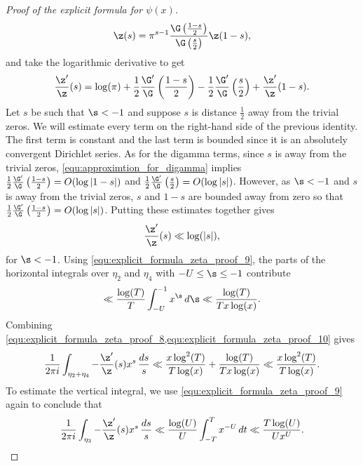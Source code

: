\begin{proof}[Proof of the explicit formula for $\psi(x)$]
      \[
        \z(s) = \pi^{s-1}\frac{\G\left(\frac{1-s}{2}\right)}{\G\left(\frac{s}{2}\right)}\z(1-s),
      \]
      and take the logarithmic derivative to get
      \[
        \frac{\z'}{\z}(s) = \log(\pi)+\frac{1}{2}\frac{\G'}{\G}\left(\frac{1-s}{2}\right)-\frac{1}{2}\frac{\G'}{\G}\left(\frac{s}{2}\right)+\frac{\z'}{\z}(1-s).
      \]
      Let $s$ be such that $\s < -1$ and suppose $s$ is distance $\frac{1}{2}$ away from the trivial zeros. We will estimate every term on the right-hand side of the previous identity. The first term is constant and the last term is bounded since it is an absolutely convergent Dirichlet series. As for the digamma terms, since $s$ is away from the trivial zeros, \cref{equ:approximtion_for_digamma} implies $\frac{1}{2}\frac{\G'}{\G}\left(\frac{1-s}{2}\right) = O(\log{|1-s|})$ and $\frac{1}{2}\frac{\G'}{\G}\left(\frac{s}{2}\right) = O(\log{|s|})$. However, as $\s < -1$ and $s$ is away from the trivial zeros, $s$ and $1-s$ are bounded away from zero so that $\frac{1}{2}\frac{\G'}{\G}\left(\frac{1-s}{2}\right) = O(\log{|s|})$. Putting these estimates together gives
      \begin{equation}\label{equ:explicit_formula_zeta_proof_9}
        \frac{\z'}{\z}(s) \ll \log(|s|),
      \end{equation}
      for $\s < -1$. Using \cref{equ:explicit_formula_zeta_proof_9}, the parts of the horizontal integrals over $\eta_{2}$ and $\eta_{4}$ with $-U \le \s \le -1$ contribute
      \begin{equation}\label{equ:explicit_formula_zeta_proof_10}
        \ll \frac{\log(T)}{T}\int_{-U}^{-1}x^{\s}\,d\s \ll \frac{\log(T)}{Tx\log(x)}.
      \end{equation}
      Combining \cref{equ:explicit_formula_zeta_proof_8,equ:explicit_formula_zeta_proof_10} gives
      \begin{equation}\label{equ:explicit_formula_zeta_proof_11}
        \frac{1}{2\pi i}\int_{\eta_{2}+\eta_{4}}-\frac{\z'}{\z}(s)x^{s}\,\frac{ds}{s} \ll \frac{x\log^{2}(T)}{T\log(x)}+\frac{\log(T)}{Tx\log(x)} \ll \frac{x\log^{2}(T)}{T\log(x)}.
      \end{equation}
      To estimate the vertical integral, we use \cref{equ:explicit_formula_zeta_proof_9} again to conclude that
      \begin{equation}\label{equ:explicit_formula_zeta_proof_12}
        \frac{1}{2\pi i}\int_{\eta_{3}}-\frac{\z'}{\z}(s)x^{s}\,\frac{ds}{s} \ll \frac{\log(U)}{U}\int_{-T}^{T}x^{-U}\,dt \ll \frac{T\log(U)}{Ux^{U}}.
      \end{equation}

\end{proof}

